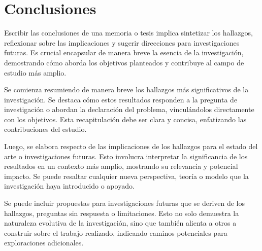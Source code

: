 \section{Conclusiones}

Escribir las conclusiones de una memoria o tesis implica sintetizar los hallazgos, reflexionar sobre las implicaciones y sugerir direcciones para investigaciones futuras. Es crucial encapsular de manera breve la esencia de la investigación, demostrando cómo aborda los objetivos planteados y contribuye al campo de estudio más amplio. 

Se comienza resumiendo de manera breve los hallazgos más significativos de la investigación. Se destaca cómo estos resultados responden a la pregunta de investigación o abordan la declaración del problema, vinculándolos directamente con los objetivos. Esta recapitulación debe ser clara y concisa, enfatizando las contribuciones del estudio.

Luego, se elabora respecto de las implicaciones de los hallazgos para el estado del arte o investigaciones futuras. Esto involucra interpretar la significancia de los resultados en un contexto más amplio, mostrando su relevancia y potencial impacto. Se puede resaltar cualquier nueva perspectiva, teoría o modelo que la investigación haya introducido o apoyado.


Se puede incluir propuestas para investigaciones futuras que se deriven de los hallazgos, preguntas sin respuesta o limitaciones. Esto no solo demuestra la naturaleza evolutiva de la investigación, sino que también alienta a otros a construir sobre el trabajo realizado, indicando caminos potenciales para exploraciones adicionales.






